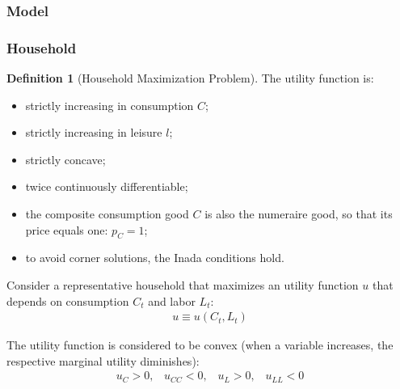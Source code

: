 \documentclass[
	12pt,
	]{article}
\numberwithin{equation}{section}
\theoremstyle{definition}
\newtheorem{definition}{Definition}[section]
\theoremstyle{plain}
\theoremstyle{plain}
\theoremstyle{plain}
\begin{document}
\subsubsection{Model}

\subsubsection{Household}


\begin{definition}[Household Maximization Problem]
	{\singlespacing
		The utility function is:
		\begin{itemize}
			\item strictly increasing in consumption $C$;
			\item strictly increasing in leisure $l$;
			\item strictly concave;
			\item twice continuously differentiable;
			\item the composite consumption good $C$ is also the numeraire good, so that its price equals one: $p_C=1$;
			\item to avoid corner solutions, the Inada conditions\footnotemark{} hold. 
	\end{itemize}}
	
	Consider a representative household that maximizes an utility function $u$ that depends on consumption $C_t$ and labor $L_t$:
	\begin{align}
		u \equiv u \left( C_t, L_t \right)
	\end{align}
	
	The utility function is considered to be convex (when a variable increases, the respective marginal utility diminishes)\footnotemark{}: 
	\begin{align*}
		u_{C} > 0 \text{,}\quad u_{CC} < 0 \text{,}\quad
		u_{L} > 0 \text{,}\quad u_{LL} < 0
	\end{align*}
	
\end{definition}
\end{document}
